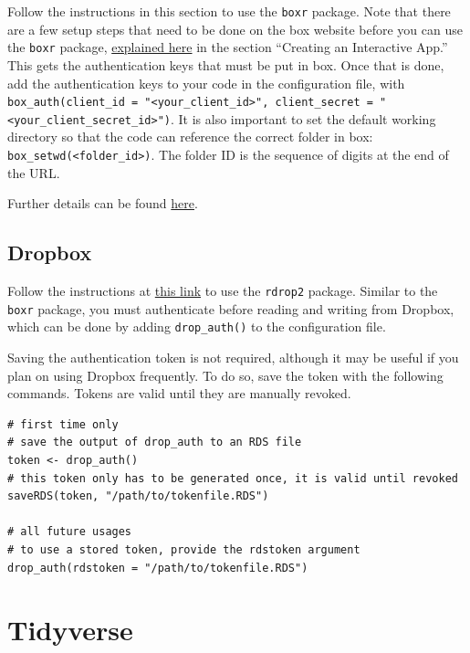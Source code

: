 \documentclass[
]{book}
\begin{document}
Follow the instructions in this section to use the \texttt{boxr} package. Note that there are a few setup steps that need to be done on the box website before you can use the \texttt{boxr} package, \href{https://r-box.github.io/boxr/articles/boxr-app-interactive.html\#create}{explained here} in the section ``Creating an Interactive App.'' This gets the authentication keys that must be put in box.
Once that is done, add the authentication keys to your code in the configuration file, with \texttt{box\_auth(client\_id\ =\ "\textless{}your\_client\_id\textgreater{}",\ client\_secret\ =\ "\textless{}your\_client\_secret\_id\textgreater{}")}. It is also important to set the default working directory so that the code can reference the correct folder in box: \texttt{box\_setwd(\textless{}folder\_id\textgreater{})}. The folder ID is the sequence of digits at the end of the URL.

Further details can be found \href{https://github.com/r-box/boxr}{here}.

\hypertarget{dropbox}{%
\subsection{Dropbox}\label{dropbox}}

Follow the instructions at \href{https://github.com/karthik/rdrop2}{this link} to use the \texttt{rdrop2} package. Similar to the \texttt{boxr} package, you must authenticate before reading and writing from Dropbox, which can be done by adding \texttt{drop\_auth()} to the configuration file.

Saving the authentication token is not required, although it may be useful if you plan on using Dropbox frequently. To do so, save the token with the following commands. Tokens are valid until they are manually revoked.

\begin{verbatim}
# first time only
# save the output of drop_auth to an RDS file
token <- drop_auth()
# this token only has to be generated once, it is valid until revoked
saveRDS(token, "/path/to/tokenfile.RDS")

# all future usages
# to use a stored token, provide the rdstoken argument
drop_auth(rdstoken = "/path/to/tokenfile.RDS")
\end{verbatim}

\hypertarget{tidyverse}{%
\section{Tidyverse}\label{tidyverse}}
\end{document}
